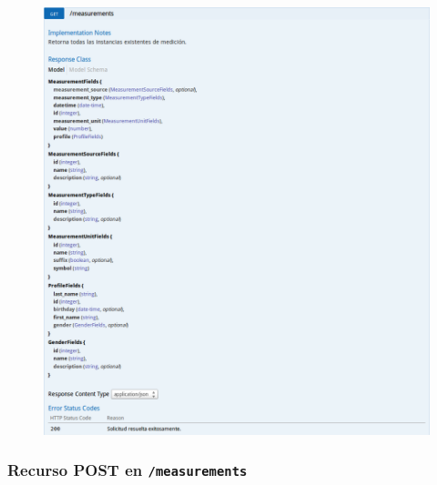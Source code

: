 \begin{figure}[h]
  \centering
  \includegraphics[width=\textwidth,height=.75\textheight,keepaspectratio]{img/especificacion_api/measurementList_get}
  \label{measurementList_get}
\end{figure}

\newpage


\subsubsection{Recurso POST en \texttt{/measurements}}


